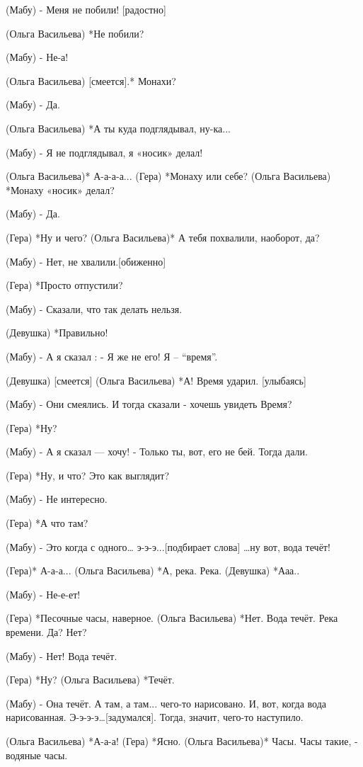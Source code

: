 (Мабу) - Меня не побили! [радостно]

(Ольга Васильева) *Не побили?

(Мабу) - Не-а! 

(Ольга Васильева) [смеется].* Монахи?

(Мабу) - Да. 

(Ольга Васильева) *А ты куда подглядывал, ну-ка...

(Мабу) - Я не подглядывал, я «носик» делал! 

(Ольга Васильева)* А-а-а-а...
(Гера) *Монаху или себе?
(Ольга Васильева) *Монаху «носик» делал? 

(Мабу) - Да.

(Гера) *Ну и чего?
(Ольга Васильева)* А тебя похвалили, наоборот, да?

(Мабу)  - Нет, не хвалили.[обиженно]

(Гера) *Просто отпустили?

(Мабу) - Сказали, что так делать нельзя.

(Девушка) *Правильно!

(Мабу) - А я сказал : - Я же не его! Я – “время”.

(Девушка) [смеется]
(Ольга Васильева) *А! Время ударил. [улыбаясь]

(Мабу) - Они смеялись. И тогда сказали - хочешь увидеть Время?

(Гера) *Ну?

(Мабу)  - А я сказал — хочу!  - Только ты, вот, его не бей. Тогда дали.

(Гера) *Ну, и что?  Это как выглядит?

(Мабу) - Не интересно.

(Гера) *А что там?

(Мабу) - Это когда с одного… э-э-э...[подбирает слова] …ну вот, вода течёт! 

(Гера)* А-а-а...
(Ольга Васильева) *А, река. Река.
(Девушка) *Ааа..

(Мабу)  - Не-е-ет!

(Гера) *Песочные часы, наверное.
(Ольга Васильева) *Нет. Вода течёт. Река времени. Да? Нет?

(Мабу) - Нет! Вода течёт.

(Гера) *Ну?
(Ольга Васильева) *Течёт.

(Мабу) - Она течёт. А там, а там... чего-то нарисовано. И, вот, когда вода нарисованная. Э-э-э-э…[задумался]. Тогда, значит, чего-то наступило. 

(Ольга Васильева) *А-а-а!
(Гера) *Ясно.
(Ольга Васильева)* Часы. Часы такие, - водяные часы.

